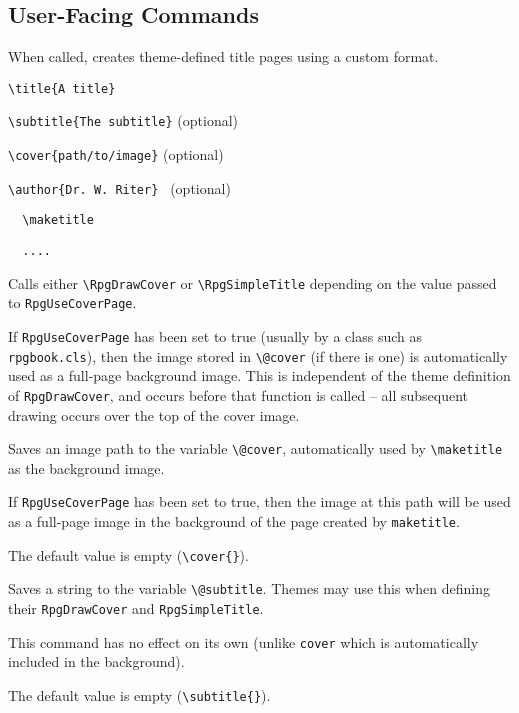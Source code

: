 		\subsection{User-Facing Commands}
			\begin{macrolist}
				\RpgMacro*[maketitle]{\maketitle,{{}}}
					{	
						When called, creates theme-defined title pages using a custom format.
					}{
						\verb|\title{A title}|

						\verb|\subtitle{The subtitle}| (optional)
						
						\verb|\cover{path/to/image}| (optional)
						
						\verb|\author{Dr. W. Riter} | (optional)
						
						\verb||
						
						\verb|	\maketitle|
						
						\verb|	....|
						
						\verb||
					}{
						Calls either \verb|\RpgDrawCover| or \verb|\RpgSimpleTitle| depending on the value passed to \verb|RpgUseCoverPage|.

						If \verb|RpgUseCoverPage| has been set to true (usually by a class such as \verb|rpgbook.cls|), then the image stored in \verb|\@cover| (if there is one) is automatically used as a full-page background image. This is independent of the theme definition of \verb|RpgDrawCover|, and occurs before that function is called -- all subsequent drawing occurs over the top of the cover image.
					}
				{Saves an image path to the variable \verb|\@cover|, automatically used by \verb|\maketitle| as the background image.
					}
					{
					}
					{
						If \verb|RpgUseCoverPage| has been set to true, then the image at this path will be used as a full-page image in the background of the page created by \verb|maketitle|.

						The default value is empty (\verb|\cover{}|).
					}
					{
						Saves a string to the variable \verb|\@subtitle|. Themes may use this when defining their \verb|RpgDrawCover| and \verb|RpgSimpleTitle|.
					}
					{
						\subtitle{<string>}
					}
					{
						This command has no effect on its own (unlike \verb|cover| which is automatically included in the background).

						The default value is empty (\verb|\subtitle{}|).
					}
			\end{macrolist}
